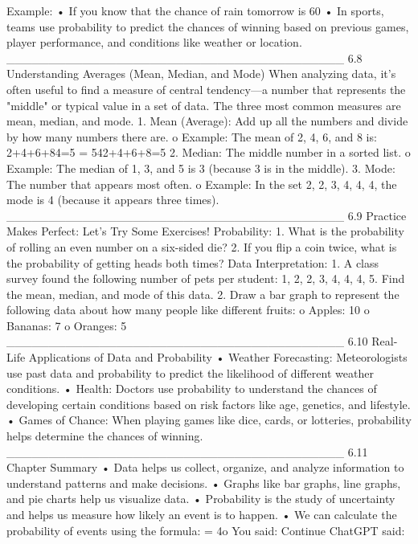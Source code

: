 Example:
•	If you know that the chance of rain tomorrow is 60%
•	In sports, teams use probability to predict the chances of winning based on previous games, player performance, and conditions like weather or location.
________________________________________
6.8 Understanding Averages (Mean, Median, and Mode)
When analyzing data, it’s often useful to find a measure of central tendency—a number that represents the "middle" or typical value in a set of data. The three most common measures are mean, median, and mode.
1.	Mean (Average): Add up all the numbers and divide by how many numbers there are.
o	Example: The mean of 2, 4, 6, and 8 is: 2+4+6+84=5 = 542+4+6+8=5
2.	Median: The middle number in a sorted list.
o	Example: The median of 1, 3, and 5 is 3 (because 3 is in the middle).
3.	Mode: The number that appears most often.
o	Example: In the set 2, 2, 3, 4, 4, 4, the mode is 4 (because it appears three times).
________________________________________
6.9 Practice Makes Perfect: Let’s Try Some Exercises!
Probability:
1.	What is the probability of rolling an even number on a six-sided die?
2.	If you flip a coin twice, what is the probability of getting heads both times?
Data Interpretation:
1.	A class survey found the following number of pets per student: 1, 2, 2, 3, 4, 4, 4, 5. Find the mean, median, and mode of this data.
2.	Draw a bar graph to represent the following data about how many people like different fruits:
o	Apples: 10
o	Bananas: 7
o	Oranges: 5
________________________________________
6.10 Real-Life Applications of Data and Probability
•	Weather Forecasting: Meteorologists use past data and probability to predict the likelihood of different weather conditions.
•	Health: Doctors use probability to understand the chances of developing certain conditions based on risk factors like age, genetics, and lifestyle.
•	Games of Chance: When playing games like dice, cards, or lotteries, probability helps determine the chances of winning.
________________________________________
6.11 Chapter Summary
•	Data helps us collect, organize, and analyze information to understand patterns and make decisions.
•	Graphs like bar graphs, line graphs, and pie charts help us visualize data.
•	Probability is the study of uncertainty and helps us measure how likely an event is to happen.
•	We can calculate the probability of events using the formula:  = 
4o
You said:
Continue
ChatGPT said:
